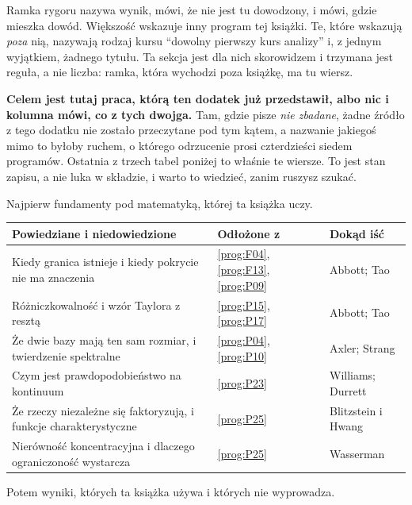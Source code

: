 Ramka rygoru nazywa wynik, mówi, że nie jest tu dowodzony, i mówi, gdzie
mieszka dowód. Większość wskazuje inny program tej książki. Te, które wskazują
\emph{poza} nią, nazywają rodzaj kursu \dash{} \enquote{dowolny pierwszy kurs
analizy} \dash{} i, z jednym wyjątkiem, żadnego tytułu. Ta sekcja jest dla nich
skorowidzem i trzymana jest reguła, a nie liczba: ramka, która wychodzi poza
książkę, ma tu wiersz.

\begin{note}
\textbf{Celem jest tutaj praca, którą ten dodatek już przedstawił, albo nic
\dash{} i kolumna mówi, co z tych dwojga.} Tam, gdzie pisze \emph{nie zbadane},
żadne źródło z tego dodatku nie zostało przeczytane pod tym kątem, a nazwanie
jakiegoś mimo to byłoby ruchem, o którego odrzucenie prosi czterdzieści siedem
programów. Ostatnia z trzech tabel poniżej to właśnie te wiersze. To jest stan
zapisu, a nie luka w składzie, i warto to wiedzieć, zanim ruszysz szukać.
\end{note}

\medskip
Najpierw fundamenty pod matematyką, której ta książka uczy.

\begin{center}
\begin{tabularx}{\linewidth}{@{}Xll@{}}
\toprule
\textbf{Powiedziane i niedowiedzione} & \textbf{Odłożone z}
  & \textbf{Dokąd iść} \\
\midrule
Kiedy granica istnieje i kiedy pokrycie nie ma znaczenia &
  \ref{prog:F04}, \ref{prog:F13}, \ref{prog:P09} & Abbott; Tao \\
Różniczkowalność i wzór Taylora z resztą &
  \ref{prog:P15}, \ref{prog:P17} & Abbott; Tao \\
Że dwie bazy mają ten sam rozmiar, i twierdzenie spektralne &
  \ref{prog:P04}, \ref{prog:P10} & Axler; Strang \\
Czym jest prawdopodobieństwo na kontinuum &
  \ref{prog:P23} & Williams; Durrett \\
Że rzeczy niezależne się faktoryzują, i funkcje charakterystyczne &
  \ref{prog:P25} & Blitzstein i Hwang \\
Nierówność koncentracyjna i dlaczego ograniczoność wystarcza &
  \ref{prog:P25} & Wasserman \\
\bottomrule
\end{tabularx}
\end{center}

\medskip
Potem wyniki, których ta książka używa i których nie wyprowadza.

